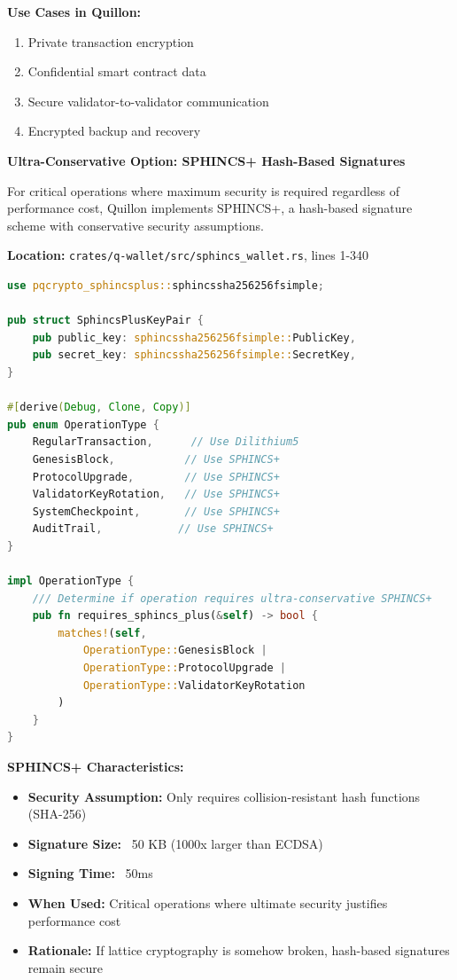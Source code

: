 \documentclass[11pt,a4paper]{article}
\begin{document}
\textbf{Use Cases in Quillon:}
\begin{enumerate}[leftmargin=*]
\item Private transaction encryption
\item Confidential smart contract data
\item Secure validator-to-validator communication
\item Encrypted backup and recovery
\end{enumerate}

\newpage

\textbf{Ultra-Conservative Option: SPHINCS+ Hash-Based Signatures}

For critical operations where maximum security is required regardless of performance cost, Quillon implements SPHINCS+, a hash-based signature scheme with conservative security assumptions.

\textbf{Location:} \texttt{crates/q-wallet/src/sphincs\_wallet.rs}, lines 1-340

\begin{lstlisting}[language=Rust,caption={SPHINCS+ Ultra-Secure Signatures for Critical Operations}]
use pqcrypto_sphincsplus::sphincssha256256fsimple;

pub struct SphincsPlusKeyPair {
    pub public_key: sphincssha256256fsimple::PublicKey,
    pub secret_key: sphincssha256256fsimple::SecretKey,
}

#[derive(Debug, Clone, Copy)]
pub enum OperationType {
    RegularTransaction,      // Use Dilithium5
    GenesisBlock,           // Use SPHINCS+
    ProtocolUpgrade,        // Use SPHINCS+
    ValidatorKeyRotation,   // Use SPHINCS+
    SystemCheckpoint,       // Use SPHINCS+
    AuditTrail,            // Use SPHINCS+
}

impl OperationType {
    /// Determine if operation requires ultra-conservative SPHINCS+
    pub fn requires_sphincs_plus(&self) -> bool {
        matches!(self,
            OperationType::GenesisBlock |
            OperationType::ProtocolUpgrade |
            OperationType::ValidatorKeyRotation
        )
    }
}
\end{lstlisting}

\textbf{SPHINCS+ Characteristics:}
\begin{itemize}[leftmargin=*]
\item \textbf{Security Assumption:} Only requires collision-resistant hash functions (SHA-256)
\item \textbf{Signature Size:} ~50 KB (1000x larger than ECDSA)
\item \textbf{Signing Time:} ~50ms
\item \textbf{When Used:} Critical operations where ultimate security justifies performance cost
\item \textbf{Rationale:} If lattice cryptography is somehow broken, hash-based signatures remain secure
\end{itemize}
\end{document}
